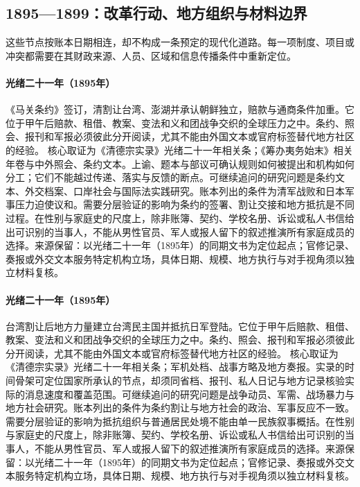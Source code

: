 \subsection{1895—1899：改革行动、地方组织与材料边界}
这些节点按账本日期相连，却不构成一条预定的现代化道路。每一项制度、项目或冲突都需要在其财政来源、人员、区域和信息传播条件中重新定位。
\hypertarget{public:EQ-1895-SHIMONOSEKI-TREATY}{}\paragraph{光绪二十一年（1895年）}《马关条约》签订，清割让台湾、澎湖并承认朝鲜独立，赔款与通商条件加重。它位于甲午后赔款、租借、教案、变法和义和团战争交织的全球压力之中。条约、照会、报刊和军报必须彼此分开阅读，尤其不能由外国文本或官府标签替代地方社区的经验。 核心取证为《清德宗实录》光绪二十一年相关条；《筹办夷务始末》相关年卷与中外照会、条约文本。上谕、题本与部议可确认规则如何被提出和机构如何分工；它们不能越过传递、落实与反馈的断点。可继续追问的研究问题是条约文本、外交档案、口岸社会与国际法实践研究。账本列出的条件为清军战败和日本军事压力迫使议和。需要分层验证的影响为条约的签署、割让交接和地方抵抗是不同过程。在性别与家庭史的尺度上，除非账簿、契约、学校名册、诉讼或私人书信给出可识别的当事人，不能从男性官员、军人或报人留下的叙述推演所有家庭成员的选择。来源保留：以光绪二十一年（1895年）的同期文书为定位起点；官修记录、奏报或外交文本服务特定机构立场，具体日期、规模、地方执行与对手视角须以独立材料复核。
\hypertarget{public:EQ-1895-TAIWAN-REPUBLIC-RESISTANCE}{}\paragraph{光绪二十一年（1895年）}台湾割让后地方力量建立台湾民主国并抵抗日军登陆。它位于甲午后赔款、租借、教案、变法和义和团战争交织的全球压力之中。条约、照会、报刊和军报必须彼此分开阅读，尤其不能由外国文本或官府标签替代地方社区的经验。 核心取证为《清德宗实录》光绪二十一年相关条；军机处档、战事方略及地方奏报。实录的时间骨架可定位国家所承认的节点，却须同省档、报刊、私人日记与地方记录核验实际的消息速度和覆盖范围。可继续追问的研究问题是战争动员、军需、战场暴力与地方社会研究。账本列出的条件为条约割让与地方社会的政治、军事反应不一致。需要分层验证的影响为抵抗组织与普通居民处境不能由单一民族叙事概括。在性别与家庭史的尺度上，除非账簿、契约、学校名册、诉讼或私人书信给出可识别的当事人，不能从男性官员、军人或报人留下的叙述推演所有家庭成员的选择。来源保留：以光绪二十一年（1895年）的同期文书为定位起点；官修记录、奏报或外交文本服务特定机构立场，具体日期、规模、地方执行与对手视角须以独立材料复核。
